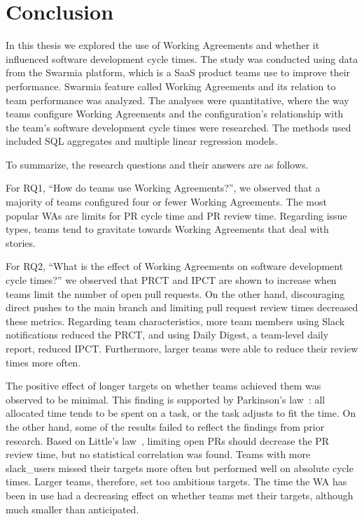 \chapter{Conclusion}

In this thesis we explored the use of Working Agreements and whether it influenced software development cycle times. The study was conducted using data from the Swarmia platform, which is a SaaS product teams use to improve their performance. Swarmia feature called Working Agreements and its relation to team performance was analyzed. The analyses were quantitative, where the way teams configure Working Agreements and the configuration's relationship with the team's software development cycle times were researched. The methods used included SQL aggregates and multiple linear regression models. 

To summarize, the research questions and their answers are as follows. 

For RQ1, ``How do teams use Working Agreements?'', we observed that a majority of teams configured four or fewer Working Agreements. The most popular WAs are limits for PR cycle time and PR review time. Regarding issue types, teams tend to gravitate towards Working Agreements that deal with stories. 

For RQ2, ``What is the effect of Working Agreements on software development cycle times?'' we observed that PRCT and IPCT are shown to increase when teams limit the number of open pull requests. On the other hand, discouraging direct pushes to the main branch and limiting pull request review times decreased these metrics. Regarding team characteristics, more team members using Slack notifications reduced the PRCT, and using Daily Digest, a team-level daily report, reduced IPCT. Furthermore, larger teams were able to reduce their review times more often.

The positive effect of longer targets on whether teams achieved them was observed to be minimal. This finding is supported by Parkinson's law~\cite{parkinson_cyril_parkinsons_1955}: all allocated time tends to be spent on a task, or the task adjusts to fit the time. On the other hand, some of the results failed to reflect the findings from prior research. Based on Little's law~\cite{chhajed_building_2008}, limiting open PRs should decrease the PR review time, but no statistical correlation was found. Teams with more slack\_users missed their targets more often but performed well on absolute cycle times. Larger teams, therefore, set too ambitious targets. The time the WA has been in use had a decreasing effect on whether teams met their targets, although much smaller than anticipated. 

